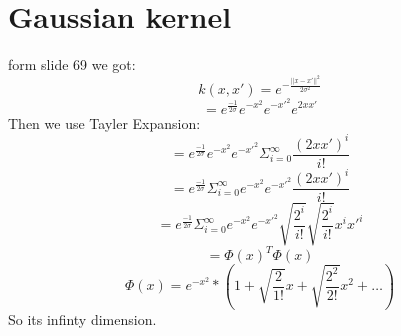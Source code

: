 \documentclass{article}
\begin{document}
 \section{Gaussian kernel}
 form slide 69 we got:
 \[k(x,x')=e^{-\frac{||x-x'||^2}{2\sigma^2}}\]
 \[=e^{\frac{-1}{2\sigma}}e^{-x^2}e^{-{x'}^2}e^{2xx'}\]
 Then we use Tayler Expansion:
 \[=e^{\frac{-1}{2\sigma}}e^{-x^2}e^{-{x'}^2}\Sigma_{i=0}^\infty \frac{(2xx')^i}{i!}\]
 \[=e^{\frac{-1}{2\sigma}}\Sigma_{i=0}^\infty e^{-x^2}e^{-{x'}^2}\frac{(2xx')^i}{i!}\]
 \[=e^{\frac{-1}{2\sigma}}\Sigma_{i=0}^\infty e^{-x^2}e^{-{x'}^2} \sqrt{\frac{2^i}{i!}} \sqrt{\frac{2^i}{i!}} x^i x'^i \]
 \[=\Phi(x)^T\Phi(x)\]
 \[\Phi(x)=e^{-x^2}*(1+\sqrt{\frac{2}{1!}}x+\sqrt{\frac{2^2}{2!}}x^2+\dots)\]
 So its infinty dimension.
\end{document}
